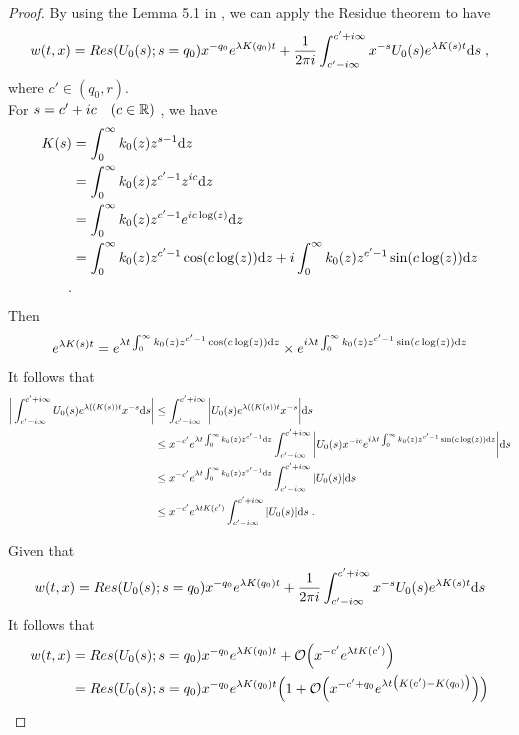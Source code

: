 \documentclass[11pt]{amsart}
\begin{document}
\begin{proof}
    By using the Lemma 5.1 in \cite{doumic2016time}, we can apply the Residue theorem to have
    \begin{equation*}
        w(t,x) = Res(U_0(s); s = q_0) x^{-q_0} e^{\lambda K(q_0)t} + \frac{1}{2\pi i} \int_{c' - i \infty}^{c' + i \infty} x^{-s}U_0(s) e^{\lambda K(s)t} \mathrm ds
        \; ,
    \end{equation*}
    where $c' \in (q_0, r)$. \\
    
    For $s = c' + ic \quad (c \in \mathbb{R})$ , we have 
    \begin{align*}
    K(s) 
    &= \int_0^\infty k_0(z) z^{s - 1} \mathrm dz \\
    &= \int_0^\infty k_0(z) z^{c' - 1} z^{ic} \mathrm dz \\
    &= \int_0^\infty k_0(z) z^{c' - 1} e^{ic \log(z)} \mathrm dz\\
    &= \int_0^\infty k_0(z) z^{c' - 1} \cos(c \log(z)) \mathrm dz + i \int_0^\infty k_0(z) z^{c' - 1} \sin(c \log(z)) \mathrm dz   \\
    \; .
    \end{align*}
    Then 
    \begin{equation}
        e^{\lambda K(s)t} = e^{\lambda t \int_0^\infty k_0(z) z^{c' - 1} \cos(c \log(z)) \mathrm dz} \times e^{i \lambda t \int_0^\infty k_0(z) z^{c' - 1} \sin(c \log(z)) \mathrm dz }
    \end{equation}
    It follows that 
    \begin{align*}
     \bigg| \int_{c' - i \infty}^{c' + i \infty} U_0(s) e^{\lambda((K(s) ) t} x^{-s}\mathrm ds \bigg| 
     &\leq \int_{c' - i \infty}^{c' + i \infty} \bigg| U_0(s) e^{\lambda((K(s) ) t} x^{-s} \bigg| \mathrm ds  \\
     &\leq x^{-c'} e^{\lambda t \int_0^\infty k_0(z) z^{c' - 1} \mathrm dz}   \int_{c' - i \infty}^{c' + i \infty} \bigg| U_0(s) x^{-ic}  e^{i \lambda t \int_0^\infty k_0(z) z^{c' - 1} \sin(c \log(z)) \mathrm dz}  \bigg| \mathrm ds \\
     &\leq x^{-c'} e^{\lambda t \int_0^\infty k_0(z) z^{c' - 1} \mathrm dz}   \int_{c' - i \infty}^{c' + i \infty} | U_0(s) | \mathrm ds \\
     &\leq x^{-c'} e^{\lambda t K(c')}   \int_{c' - i \infty}^{c' + i \infty} | U_0(s) | \mathrm ds 
     \; .
    \end{align*}
    
    Given that
    \begin{equation}
        w(t,x) = Res(U_0(s); s = q_0) x^{-q_0} e^{\lambda K(q_0)t} + \frac{1}{2\pi i} \int_{c' - i \infty}^{c' + i \infty} x^{-s}U_0(s) e^{\lambda K(s)t} \mathrm ds 
    \end{equation}
    It follows that 
    \begin{align}
        w(t,x) 
        &= Res(U_0(s); s = q_0) x^{-q_0} e^{\lambda K(q_0)t} + \mathcal{O} \Big( x^{-c'} e^{\lambda t K(c')} \Big) \\
        &= Res(U_0(s); s = q_0) x^{-q_0} e^{\lambda K(q_0)t} \Big( 1 + \mathcal{O} \Big( x^{-c' + q_0} e^{\lambda t \big( K(c') - K(q_0) \big) } \Big) \Big)
    \end{align}

\end{proof}
\end{document}

